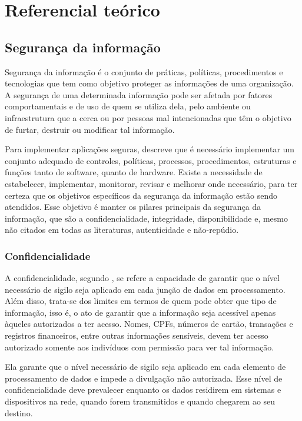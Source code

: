 
    \chapter{Referencial teórico}
    
    \section{Segurança da informação}
    Segurança da informação é o conjunto de práticas, políticas, procedimentos e tecnologias que tem como objetivo proteger as informações de uma organização. A segurança de uma determinada informação pode ser afetada por fatores comportamentais e de uso de quem se utiliza dela, pelo ambiente ou infraestrutura que a cerca ou por pessoas mal intencionadas que têm o objetivo de furtar, destruir ou modificar tal informação.
    
    Para implementar aplicações seguras,  descreve que é necessário implementar um conjunto adequado de controles, políticas, processos, procedimentos, estruturas e funções tanto de software, quanto de hardware. Existe a necessidade de estabelecer, implementar, monitorar, revisar e melhorar onde necessário, para ter certeza que os objetivos específicos da segurança da informação estão sendo atendidos. Esse objetivo é manter os pilares principais da segurança da informação, que são a confidencialidade, integridade, disponibilidade e, mesmo não citados em todas as literaturas, autenticidade e não-repúdio.
    
    \subsection{Confidencialidade}
    A confidencialidade, segundo , se refere a capacidade de garantir que o nível necessário de sigilo seja aplicado em cada junção de dados em processamento. Além disso, trata-se dos limites em termos de quem pode obter que tipo de informação, isso é, o ato de garantir que a informação seja acessível apenas àqueles autorizados a ter acesso. Nomes, CPFs, números de cartão, transações e registros financeiros, entre outras informações sensíveis, devem ter acesso autorizado somente aos indivíduos com permissão para ver tal informação. 
    
    Ela garante que o nível necessário de sigilo seja aplicado em cada elemento de processamento de dados e impede a divulgação não autorizada. Esse nível de confidencialidade deve prevalecer enquanto os dados residirem em sistemas e dispositivos na rede, quando forem transmitidos e quando chegarem ao seu destino.
    

